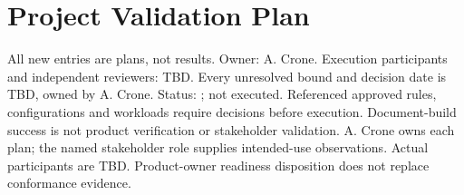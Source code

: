 \section{Project Validation Plan}\label{Section:ProjectValidationPlan}
All new entries are plans, not results. Owner: A. Crone. Execution participants
and independent reviewers: TBD. Every unresolved bound and decision date is
TBD, owned by A. Crone. Status: \StatusPending; not executed. Referenced
approved rules, configurations and workloads require decisions before execution.
Document-build success is not product verification or stakeholder validation.
A. Crone owns each plan; the named stakeholder role supplies intended-use
observations. Actual participants are TBD. Product-owner readiness disposition
does not replace  conformance evidence.
\begin{landscape}\small


\end{landscape}
